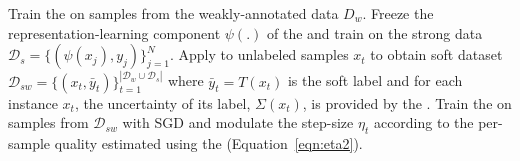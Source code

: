 \setlength{\textfloatsep}{10pt}
\begin{algorithm}[t!]
\small
\caption{\fwlfull.}%
\begin{algorithmic}[1]
\State Train the \std on samples from the weakly-annotated data $D_w$.
\medskip
\State Freeze the representation-learning component $\psi(.)$ of the \std and train \tch on the strong data $\mathcal{D}_s=\{(\psi(x_j),y_j)\}_{j=1}^{N}$. Apply \tch to unlabeled samples $x_t$ to obtain soft dataset $\mathcal{D}_{sw}=\{(x_t,\bar{y}_t)\}_{t=1}^{|\mathcal{D}_w \cup \mathcal{D}_s|}$ where $\bar{y}_t=T(x_t)$ is the soft label and for each instance $x_t$, the uncertainty of its label, $\Sigma(x_t)$, is provided by the \tch.
\medskip
\State Train the \std on samples from $\mathcal{D}_{sw}$ with SGD and modulate the step-size $\eta_t$ according to the per-sample quality estimated using the \tch (Equation~\ref{eqn:eta2}).
\end{algorithmic}
\label{alg:fwl:main}
\end{algorithm}
